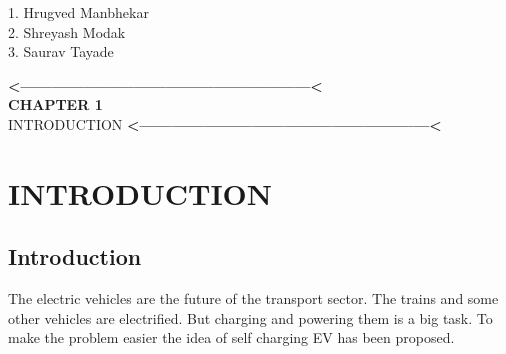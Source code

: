 \documentclass[a4paper,12pt]{article}
\begin{document}
\vspace{4cm}
\begin{flushright}
1. Hrugved Manbhekar\\[1in]
2. Shreyash Modak\\[1in]
3. Saurav Tayade\\


\end{flushright}

\newpage
\tableofcontents
{}
\newpage
\listoffigures
{}

\newpage
\listoftables
{}


\newpage

\pagestyle{fancy}
\fancyhf{}
\fancyfoot[R]{\thepage}
\renewcommand{\footrulewidth}{1pt}


\newpage
\thispagestyle{empty}
\vspace*{0.25\textheight}
\begin{center}
\begin{center}
{\bfseries\LARGE <------------------------------------------------------<}\\
{\bfseries\LARGE CHAPTER 1}\\[2cm]


{\scshape\Huge INTRODUCTION}
{\bfseries\LARGE <------------------------------------------------------<}
\end{center}
\end{center}
\newpage

\section{INTRODUCTION}
\subsection{Introduction}
The electric vehicles are the future of the transport sector. The trains and some other vehicles are electrified. But charging and powering them is a big task. To make the problem easier the idea of self charging EV has been proposed. 
\end{document}
